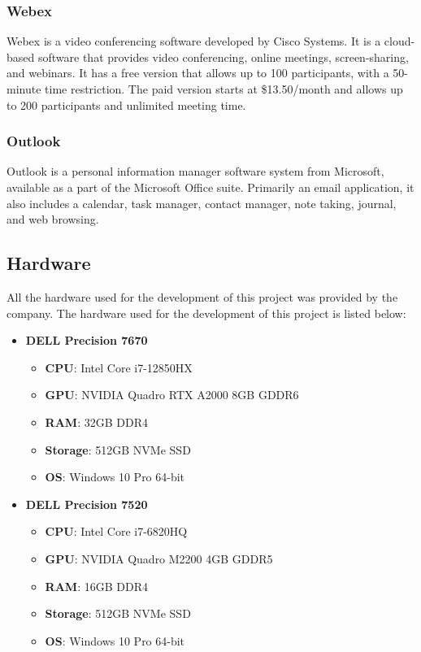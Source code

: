 \subsubsection*{Webex}
\label{subsubsec:webex}
Webex is a video conferencing software developed by Cisco Systems. It is a
cloud-based software that provides video conferencing, online meetings,
screen-sharing, and webinars. It has a free version that allows up to 100
participants, with a 50-minute time restriction. The paid version starts at
\$13.50/month and allows up to 200 participants and unlimited meeting time.
\subsubsection*{Outlook}
\label{subsubsec:outlook}
Outlook is a personal information manager software system from Microsoft,
available as a part of the Microsoft Office suite. Primarily an email
application, it also includes a calendar, task manager, contact manager,
note taking, journal, and web browsing.

\subsection*{Hardware}
\label{subsec:hardware}
All the hardware used for the development of this project was provided by the
company. The hardware used for the development of this project is listed below: \\
\begin{itemize}
    \item \textbf{DELL Precision 7670}
    \begin{itemize}
        \item \textbf{CPU}: Intel Core i7-12850HX
        \item \textbf{GPU}: NVIDIA Quadro RTX A2000 8GB GDDR6
        \item \textbf{RAM}: 32GB DDR4
        \item \textbf{Storage}: 512GB NVMe SSD
        \item \textbf{OS}: Windows 10 Pro 64-bit
    \end{itemize}
    \item \textbf{DELL Precision 7520}
    \begin{itemize}
        \item \textbf{CPU}: Intel Core i7-6820HQ
        \item \textbf{GPU}: NVIDIA Quadro M2200 4GB GDDR5
        \item \textbf{RAM}: 16GB DDR4
        \item \textbf{Storage}: 512GB NVMe SSD
        \item \textbf{OS}: Windows 10 Pro 64-bit
    \end{itemize}
\end{itemize}
